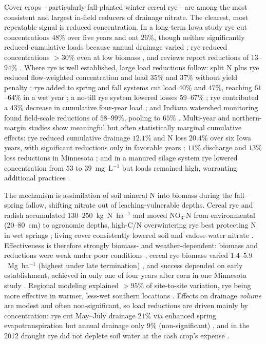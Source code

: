 Cover crops---particularly fall-planted winter cereal rye---are among the
most consistent and largest in-field reducers of drainage nitrate. The
clearest, most repeatable signal is reduced concentration. In a long-term
Iowa study rye cut concentrations $48\%$ over five years and oat $26\%$,
though neither significantly reduced cumulative loads because annual drainage
varied \parencite{Kaspar2012}; rye reduced concentrations $>30\%$ even at low
biomass \parencite{Waring2020}, and reviews report reductions of
$13$--$94\%$ \parencite{Ward2018}. Where rye is well established, large load
reductions follow: split N plus rye reduced flow-weighted concentration and
load $35\%$ and $37\%$ without yield penalty \parencite{PrezaFontes2021}; rye
added to spring and fall systems cut load $40\%$ and $47\%$, reaching
$61$--$64\%$ in a wet year \parencite{Ruffatti2019}; a no-till rye system
lowered losses $59$--$67\%$ \parencite{OBrien2022}; rye contributed a $43\%$
decrease in cumulative four-year load \parencite{Gentry2024}; and Indiana
watershed monitoring found field-scale reductions of $58$--$99\%$, pooling to
$65\%$ \parencite{Vincent2025}. Multi-year and northern-margin studies show
meaningful but often statistically marginal cumulative effects: rye reduced
cumulative drainage $12.1\%$ and N loss $20.4\%$ over six Iowa years, with
significant reductions only in favorable years \parencite{MartinezFeria2016};
$11\%$ discharge and $13\%$ loss reductions in Minnesota \parencite{Strock2004};
and in a manured silage system rye lowered concentration from $53$ to
$39$~mg~L$^{-1}$ but loads remained high, warranting additional practices
\parencite{Krueger2013}.

The mechanism is assimilation of soil mineral N into biomass during the
fall--spring fallow, shifting nitrate out of leaching-vulnerable depths.
Cereal rye and radish accumulated $130$--$250$~kg~N~ha$^{-1}$ and moved
NO$_3$-N from environmental (20--80~cm) to agronomic depths, high-C/N
overwintering rye best protecting N in wet springs \parencite{Lacey2015};
living cover consistently lowered soil and vadose-water nitrate
\parencite{Bosompemaa2021,Strock2004,Qi2011b}. Effectiveness is therefore
strongly biomass- and weather-dependent: biomass and reductions were weak
under poor conditions \parencite{PrezaFontes2021,OBrien2022}, cereal rye
biomass varied $1.4$--$5.9$~Mg~ha$^{-1}$ (highest under late termination)
\parencite{Gentry2025,Birru2023}, and success depended on early establishment,
achieved in only one of four years after corn in one Minnesota study
\parencite{Strock2004,Bawa2023}. Regional modeling explained $>95\%$ of
site-to-site variation, rye being more effective in warmer, less-wet southern
locations \parencite{Malone2014b}. Effects on drainage \emph{volume} are
modest and often non-significant, so load reductions are driven mainly by
concentration: rye cut May--July drainage $21\%$ via enhanced spring
evapotranspiration but annual drainage only $9\%$ (non-significant)
\parencite{Qi2010b,Qi2011b}, and in the 2012 drought rye did not deplete soil
water at the cash crop's expense \parencite{Daigh2014b}.

